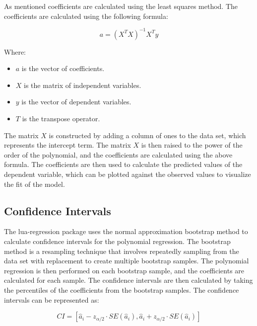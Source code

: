 \documentclass[11pt]{article}
\begin{document}
	As mentioned coefficients are calculated using the least squares method.
    The coefficients are calculated using the following formula:

    \begin{equation}
        a = \left(X^TX\right)^{-1}X^Ty
    \end{equation}

    
    Where:

    \begin{itemize}
        \item $a$ is the vector of coefficients.
        \item $X$ is the matrix of independent variables.
        \item $y$ is the vector of dependent variables.
        \item $T$ is the transpose operator.
    \end{itemize}

    The matrix $X$ is constructed by adding a column of ones to the data set, which represents the intercept term.
    The matrix $X$ is then raised to the power of the order of the polynomial, and the coefficients are calculated using the above formula.
    The coefficients are then used to calculate the predicted values of the dependent variable, which can be plotted against the observed values to visualize the fit of the model.

    \subsection{Confidence Intervals}

    The {\ttfamily lua-regression} package uses the normal approximation bootstrap method to calculate confidence intervals for the polynomial regression.
    The bootstrap method is a resampling technique that involves repeatedly sampling from the data set with replacement to create multiple bootstrap samples.
    The polynomial regression is then performed on each bootstrap sample, and the coefficients are calculated for each sample.
    The confidence intervals are then calculated by taking the percentiles of the coefficients from the bootstrap samples.
    The confidence intervals can be represented as:

    \begin{equation}
        CI = \left[\hat{a}_i - z_{\alpha/2} \cdot SE(\hat{a}_i), \hat{a}_i + z_{\alpha/2} \cdot SE(\hat{a}_i)\right]
    \end{equation}
\end{document}
